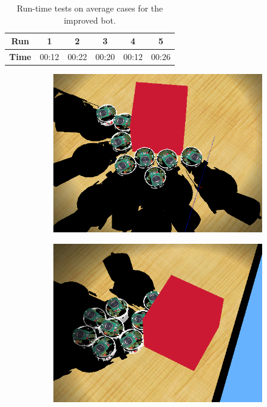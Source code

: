 \documentclass[a4paper,10pt]{article}
\begin{document}
\begin{table}[h]
    \centering
    \begin{tabular}{c|c|c|c|c|c}
        \textbf{Run}    & \textbf{1} & \textbf{2} & \textbf{3} &
        \textbf{4}      & \textbf{5}     \\ \hline
        \textbf{Time}   & 00:12 & 00:22 & 00:20 & 00:12 & 00:26 \\
    \end{tabular}
    \caption{Run-time tests on average cases for the improved bot.}
    \label{improved bot tests}
\end{table}

\begin{figure}[!h]
    \centering

    \begin{subfigure}[!h]{0.45\textwidth}
        \includegraphics[width=\textwidth]{models/stresstest.PNG}
    \end{subfigure}
    \begin{subfigure}[!h]{0.45\textwidth}
        \includegraphics[width=\textwidth]{models/stresstest2.PNG}
    \end{subfigure}


\end{figure}
\end{document}
